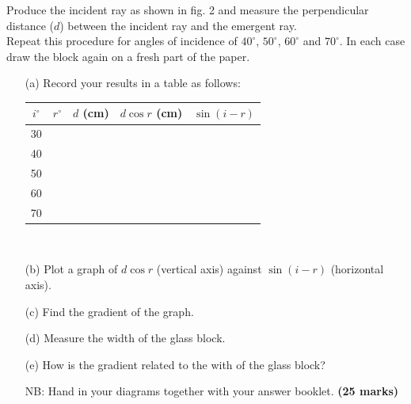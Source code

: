 \begin{enumerate}
Produce the incident ray as shown in fig. 2 and measure the perpendicular distance ($d$) between the incident ray and the emergent ray.\\
Repeat this procedure for angles of incidence of $40^\circ$, $50^\circ$, $60^\circ$ and $70^\circ$. In each case draw the block again on a fresh part of the paper.
\begin{enumerate}
\item[(a)] Record your results in a table as follows:
\begin{tabular}{|p{}|p{}|p{}|p{}|p{}|} \hline
\multicolumn{1}{|c|}{$i^\circ$} & \multicolumn{1}{c|}{$r^\circ$} & \multicolumn{1}{c|}{$d$ (cm)} & \multicolumn{1}{c|}{$d\cos{r}$ (cm)} & \multicolumn{1}{c|}{$\sin{(i-r)}$} \\ \hline
\multicolumn{1}{|c|}{30}&&&& \\
\multicolumn{1}{|c|}{40}&&&& \\
\multicolumn{1}{|c|}{50}&&&& \\
\multicolumn{1}{|c|}{60}&&&& \\
\multicolumn{1}{|c|}{70}&&&& \\ \hline
\end{tabular}\\[10pt]
\item[(b)] Plot a graph of $d \cos{r}$ (vertical axis) against $\sin{(i - r)}$ (horizontal axis).
\item[(c)] Find the gradient of the graph.
\item[(d)] Measure the width of the glass block.
\item[(e)] How is the gradient related to the with of the glass block?
\item[] NB: Hand in your diagrams together with your answer booklet. \hfill \textbf{(25 marks)}
\end{enumerate}
\end{enumerate}

